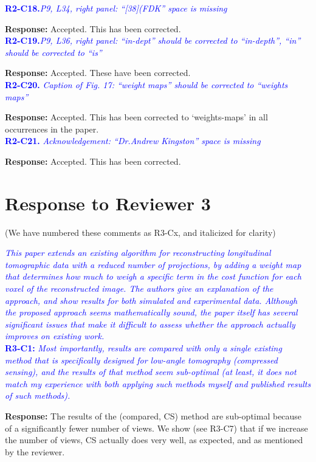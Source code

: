 \documentclass{article}
\begin{document}
\textcolor{blue}{\textbf{R2-C18.}\textit{P9, L34, right panel: ``[38](FDK'' space is missing}}
 
 \textbf{Response:} Accepted. This has been corrected.\\

 \textcolor{blue}{\textbf{R2-C19.}\textit{P9, L36, right panel: ``in-dept'' should be corrected to ``in-depth'', ``in'' should be corrected to ``is''}}
 
 \textbf{Response:} Accepted. These have been corrected.\\

 \textcolor{blue}{\textbf{R2-C20.}\textit{ Caption of Fig. 17: ``weight maps'' should be corrected to ``weights maps''}}
 
\textbf{ Response:} Accepted. This has been corrected to `weights-maps' in all occurrences in the paper.\\

 \textcolor{blue}{\textbf{R2-C21.}\textit{ Acknowledgement: ``Dr.Andrew Kingston'' space is missing}}
 
\textbf{ Response:} Accepted. This has been corrected.      

\section{Response to Reviewer 3}
(We have numbered these comments as R3-Cx, and italicized for clarity)

\textcolor{blue}{\textit{This paper extends an existing algorithm for reconstructing longitudinal tomographic data with a reduced number of projections, by adding a weight map that determines how much to weigh a specific term in the cost function for each voxel of the reconstructed image. The authors give an explanation of the approach, and show results for both simulated and experimental data. Although the proposed approach seems mathematically sound, the paper itself has several significant issues that make it difficult to assess whether the approach actually improves on existing work. }}\\

\textcolor{blue}{\textbf{R3-C1:}\textit{ Most importantly, results are compared with only a single existing method that is specifically designed for low-angle tomography (compressed sensing), and the results of that method seem sub-optimal (at least, it does not match my experience with both applying such methods myself and published results of such methods). }}

\textbf{ Response:} The results of the (compared, CS) method are sub-optimal because of a significantly fewer number of views.  We show  (see R3-C7) that if we increase the number of views, CS actually does very well, as expected, and as mentioned by the reviewer.
\end{document}
